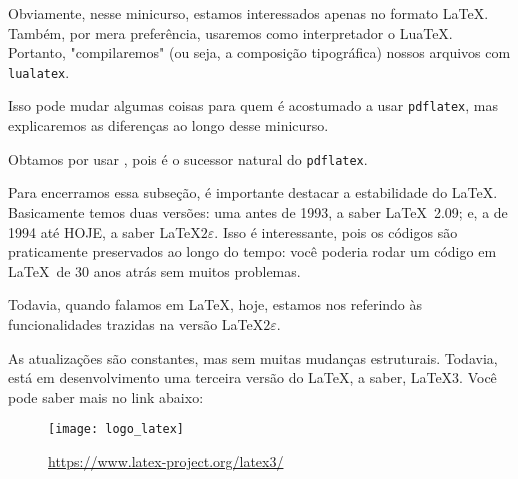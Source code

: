 Obviamente, nesse minicurso, estamos interessados apenas no formato \LaTeX.
Também, por mera preferência, usaremos como interpretador o Lua\TeX.
Portanto, "compilaremos" (ou seja, a composição tipográfica) nossos arquivos 
com \texttt{lualatex}.

\begin{aviso}
  Isso pode mudar algumas coisas para quem é acostumado a usar \texttt{pdflatex}, 
  mas explicaremos as diferenças ao longo desse minicurso.  
\end{aviso}

Obtamos por usar \lualatex, pois é o sucessor natural do \texttt{pdflatex}. 

Para encerramos essa subseção, é importante destacar a estabilidade do \LaTeX.
Basicamente temos duas versões: uma antes de 1993, a saber \LaTeX~2.09; e,
a de 1994 até HOJE, a saber \LaTeX$2\varepsilon$.
Isso é interessante, pois os códigos são praticamente preservados ao longo do 
tempo: você poderia rodar um código em \LaTeX\ de 30 anos atrás sem muitos 
problemas.

Todavia, quando falamos em \LaTeX{}, hoje, estamos nos referindo às 
funcionalidades trazidas na versão \LaTeX$2\varepsilon$.

As atualizações são constantes, mas sem muitas mudanças estruturais.
Todavia, está em desenvolvimento uma terceira versão do \LaTeX, a saber, \LaTeX3.
Você pode saber mais no link abaixo:

\begin{figure}[!htbp]
  \centering
  \texttt{[image: logo\_latex]}
  \caption{\href{https://www.latex-project.org/latex3/}{\textcolor{azulUFRB}{https://www.latex-project.org/latex3/}}}
\end{figure}

 

